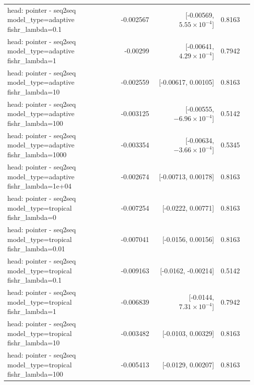 \documentclass[10pt]{article}
\makeatletter
\newcommand{\stackcell}[1]{\begin{tabular}[t]{@{}l@{}}#1\end{tabular}}
\makeatother
\begin{document}
{\begin{longtable}{lrrrl}
\stackcell{head: pointer - seq2seq\\\footnotesize model\_type=adaptive fishr\_lambda=0.1 } & -0.002567 & [-0.00569, $5.55\times10^{-4}$] & 0.8163 & \\
\stackcell{head: pointer - seq2seq\\\footnotesize model\_type=adaptive fishr\_lambda=1 } & -0.00299 & [-0.00641, $4.29\times10^{-4}$] & 0.7942 & \\
\stackcell{head: pointer - seq2seq\\\footnotesize model\_type=adaptive fishr\_lambda=10 } & -0.002559 & [-0.00617, 0.00105] & 0.8163 & \\
\stackcell{head: pointer - seq2seq\\\footnotesize model\_type=adaptive fishr\_lambda=100 } & -0.003125 & [-0.00555, $-6.96\times10^{-4}$] & 0.5142 & \\
\stackcell{head: pointer - seq2seq\\\footnotesize model\_type=adaptive fishr\_lambda=1000 } & -0.003354 & [-0.00634, $-3.66\times10^{-4}$] & 0.5345 & \\
\stackcell{head: pointer - seq2seq\\\footnotesize model\_type=adaptive fishr\_lambda=1e+04 } & -0.002674 & [-0.00713, 0.00178] & 0.8163 & \\
\stackcell{head: pointer - seq2seq\\\footnotesize model\_type=tropical fishr\_lambda=0 } & -0.007254 & [-0.0222, 0.00771] & 0.8163 & \\
\stackcell{head: pointer - seq2seq\\\footnotesize model\_type=tropical fishr\_lambda=0.01 } & -0.007041 & [-0.0156, 0.00156] & 0.8163 & \\
\stackcell{head: pointer - seq2seq\\\footnotesize model\_type=tropical fishr\_lambda=0.1 } & -0.009163 & [-0.0162, -0.00214] & 0.5142 & \\
\stackcell{head: pointer - seq2seq\\\footnotesize model\_type=tropical fishr\_lambda=1 } & -0.006839 & [-0.0144, $7.31\times10^{-4}$] & 0.7942 & \\
\stackcell{head: pointer - seq2seq\\\footnotesize model\_type=tropical fishr\_lambda=10 } & -0.003482 & [-0.0103, 0.00329] & 0.8163 & \\
\stackcell{head: pointer - seq2seq\\\footnotesize model\_type=tropical fishr\_lambda=100 } & -0.005413 & [-0.0129, 0.00207] & 0.8163 & \\

\end{longtable}}
\end{document}
